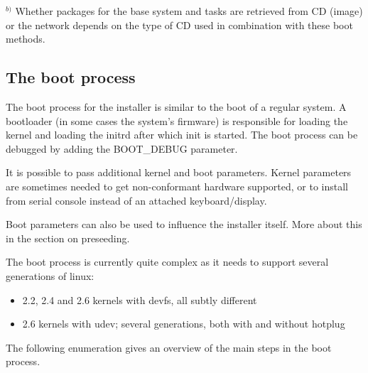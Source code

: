\documentclass[a4paper,10pt]{article}
\begin{document}
\begin{flushleft}
$^{b)}$ Whether packages for the base system and tasks are retrieved from CD (image) or the network depends on the type of CD used in combination with these boot methods.
\end{flushleft}

\subsection{The boot process}
The boot process for the installer is similar to the boot of a regular system. A bootloader (in some cases the system's firmware) is responsible for loading the kernel and loading the initrd after which init is started. The boot process can be debugged by adding the BOOT\_DEBUG parameter. 

It is possible to pass additional kernel and boot parameters. Kernel parameters are sometimes needed to get non-conformant hardware supported, or to install from serial console instead of an attached keyboard/display. 

Boot parameters can also be used to influence the installer itself. More about this in the section on preseeding. 

The boot process is currently quite complex as it needs to support several generations of linux: 

\begin{itemize}
\item 2.2, 2.4 and 2.6 kernels with devfs, all subtly different
\item 2.6 kernels with udev; several generations, both with and without hotplug
\end{itemize}

The following enumeration gives an overview of the main steps in the boot process. 
\end{document}
